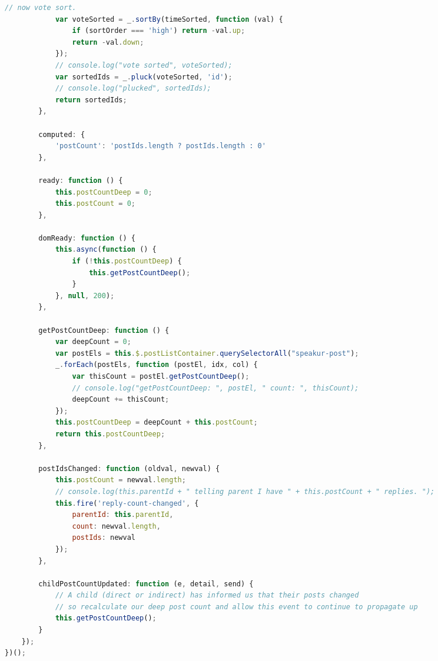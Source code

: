 \begin{changemargin}{-1cm}{-1.5cm}
\begin{lstlisting}[language=JavaScript,caption=
{\tcode{speakur-post-set.js}},label=l:appendix1b,captionpos=top]
            // now vote sort.
            var voteSorted = _.sortBy(timeSorted, function (val) {
                if (sortOrder === 'high') return -val.up;
                return -val.down;
            });
            // console.log("vote sorted", voteSorted);
            var sortedIds = _.pluck(voteSorted, 'id');
            // console.log("plucked", sortedIds);
            return sortedIds;
        },

        computed: {
            'postCount': 'postIds.length ? postIds.length : 0'
        },

        ready: function () {
            this.postCountDeep = 0;
            this.postCount = 0;
        },

        domReady: function () {
            this.async(function () {
                if (!this.postCountDeep) {
                    this.getPostCountDeep();
                }
            }, null, 200);
        },

        getPostCountDeep: function () {
            var deepCount = 0;
            var postEls = this.$.postListContainer.querySelectorAll("speakur-post");
            _.forEach(postEls, function (postEl, idx, col) {
                var thisCount = postEl.getPostCountDeep();
                // console.log("getPostCountDeep: ", postEl, " count: ", thisCount);
                deepCount += thisCount;
            });
            this.postCountDeep = deepCount + this.postCount;
            return this.postCountDeep;
        },

        postIdsChanged: function (oldval, newval) {
            this.postCount = newval.length;
            // console.log(this.parentId + " telling parent I have " + this.postCount + " replies. ");
            this.fire('reply-count-changed', {
                parentId: this.parentId,
                count: newval.length,
                postIds: newval
            });
        },

        childPostCountUpdated: function (e, detail, send) {
            // A child (direct or indirect) has informed us that their posts changed
            // so recalculate our deep post count and allow this event to continue to propagate up
            this.getPostCountDeep();
        }
    });
})();
\end{lstlisting}

\end{changemargin}
